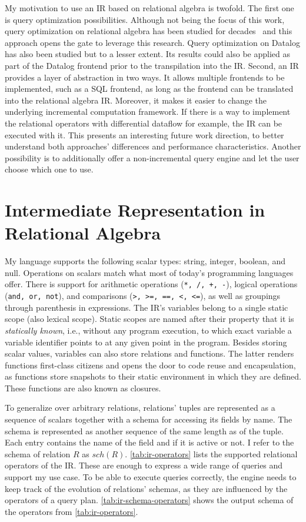 My motivation to use an \ac{IR} based on relational algebra is twofold.
The first one is query optimization possibilities.
Although not being the focus of this work, query optimization on relational
algebra has been studied for decades~\cite{selinger1979access} and this approach
opens the gate to leverage this research.
Query optimization on Datalog has also been studied but to a lesser extent.
Its results could also be applied as part of the Datalog frontend prior to the
transpilation into the \ac{IR}.
Second, an \ac{IR} provides a layer of abstraction in two ways.
It allows multiple frontends to be implemented, such as a SQL frontend,
as long as the frontend can be translated into the relational algebra \ac{IR}.
Moreover, it makes it easier to change the underlying incremental computation
framework.
If there is a way to implement the relational operators with differential
dataflow for example, the \ac{IR} can be executed with it.
This presents an interesting future work direction, to better understand
both approaches' differences and performance characteristics.
Another possibility is to additionally offer a non-incremental query engine
and let the user choose which one to use.

\section{Intermediate Representation in Relational Algebra}\label{sec:ir}

My language supports the following scalar types: string, integer, boolean, and null.
Operations on scalars match what most of today's programming languages offer.
There is support for arithmetic operations (\texttt{*, /, +, -}),
logical operations (\texttt{and, or, not}),
and comparisons (\texttt{>, >=, ==, <, <=}),
as well as groupings through parenthesis in expressions.
The \ac{IR}'s variables belong to a single static scope (also lexical scope).
Static scopes are named after their property that it is \emph{statically known},
i.e., without any program execution, to which exact variable a
variable identifier points to at any given point in the program.
Besides storing scalar values, variables can also store relations and functions.
The latter renders functions first-class citizens and opens the door to
code reuse and encapsulation, as functions store snapshots to their static
environment in which they are defined.
These functions are also known as closures.

To generalize over arbitrary relations, relations' tuples are represented as
a sequence of scalars together with a schema for accessing its fields by name.
The schema is represented as another sequence of the same length as of the tuple.
Each entry contains the name of the field and if it is active or not.
I refer to the schema of relation \(R\) as \(\mathit{sch}(R)\).
\ref{tab:ir-operators} lists the supported relational operators of the \ac{IR}.
These are enough to express a wide range of queries and support my use case.
To be able to execute queries correctly, the engine needs to keep track of
the evolution of relations' schemas, as they are influenced by the operators
of a query plan.
\ref{tab:ir-schema-operators} shows the output schema of the operators from
\ref{tab:ir-operators}.

